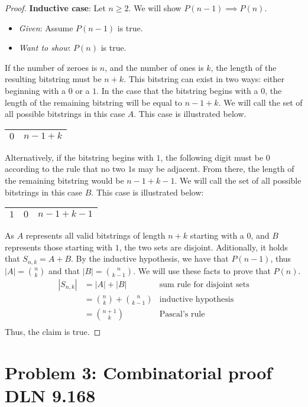 \documentclass[titlepage]{article}
\begin{document}
\begin{proof}
\textbf{Inductive case}: Let $n \geq 2$.  We will show $ P(n-1) \implies P(n)$.
\begin{itemize}
\item \emph{Given}: Assume $P(n-1)$ is true.
\item \emph{Want to show}: $P(n)$ is true.
\end{itemize}
If the number of zeroes is $n$, and the number of ones is $k$, the length of the resulting bitstring must be $n+k$. This bitstring can exist in two ways: either beginning with a $0$ or a $1$. In the case that the bitstring begins with a $0$, the length of the remaining bitstring will be equal to $n-1+k$. We will call the set of all possible bitstrings in this case $A$. This case is illustrated below.
\begin{center}
  \begin{tabular}{ | c | c |}
    \hline
    $0$ & $n-1+k$  \\ \hline
  \end{tabular}
\end{center}
Alternatively, if the bitstring begins with $1$, the following digit must be $0$ according to the rule that no two $1$s may be adjacent. From there, the length of the remaining bitstring would be $n-1+k-1$. We will call the set of all possible bitstrings in this case $B$. This case is illustrated below:
\begin{center}
  \begin{tabular}{ | c | c | c |}
    \hline
    $1$ & $0$ & $n-1+k-1$  \\ \hline
  \end{tabular}
\end{center}
As $A$ represents all valid bitstrings of length $n+k$ starting with a 0, and $B$ represents those starting with $1$, the two sets are disjoint. Aditionally, it holds that $S_{n,k} = A+B$. By the inductive hypothesis, we have that $P(n-1)$, thus $|A|={{n}\choose{k}}$ and that $|B|={{n}\choose{k-1}}$. We will use these facts to prove that $P(n)$.
\begin{align*}
|S_{n,k}| &= |A|+|B| & \text{sum rule for disjoint sets} \\
&= {{n}\choose{k}}+{{n}\choose{k-1}} & \text{inductive hypothesis} \\
&= {{n+1}\choose{k}} & \text{Pascal's rule}\\
\end{align*}
Thus, the claim is true.
\end{proof}

\section{Problem 3: Combinatorial proof DLN 9.168}
\end{document}
